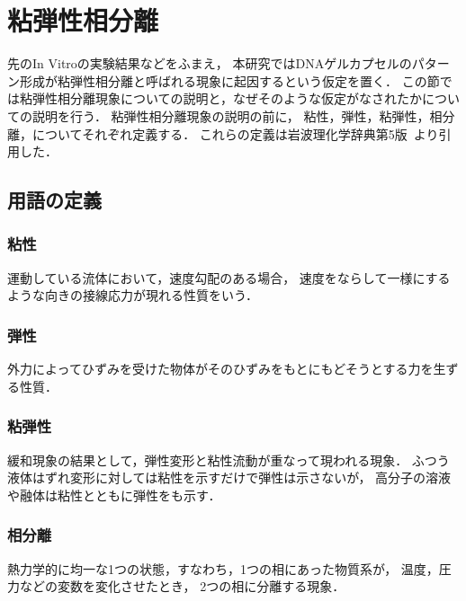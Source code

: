 \section{粘弾性相分離}
先のIn Vitroの実験結果などをふまえ，
本研究ではDNAゲルカプセルのパターン形成が粘弾性相分離と呼ばれる現象に起因するという仮定を置く．
この節では粘弾性相分離現象についての説明と，なぜそのような仮定がなされたかについての説明を行う．
粘弾性相分離現象の説明の前に，
粘性，弾性，粘弾性，相分離，についてそれぞれ定義する．
これらの定義は岩波理化学辞典第5版~\cite{rikagakuiwanami}より引用した．


\subsection{用語の定義}


\subsubsection{粘性}
運動している流体において，速度勾配のある場合，
速度をならして一様にするような向きの接線応力が現れる性質をいう．


\subsubsection{弾性}
外力によってひずみを受けた物体がそのひずみをもとにもどそうとする力を生ずる性質．


\subsubsection{粘弾性}
緩和現象の結果として，弾性変形と粘性流動が重なって現われる現象．
ふつう液体はずれ変形に対しては粘性を示すだけで弾性は示さないが，
高分子の溶液や融体は粘性とともに弾性をも示す．


\subsubsection{相分離}
熱力学的に均一な1つの状態，すなわち，1つの相にあった物質系が，
温度，圧力などの変数を変化させたとき，
2つの相に分離する現象．


